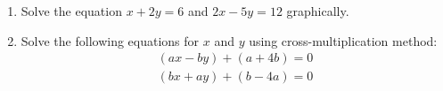 \begin{enumerate}
\item Solve the equation $x+2y=6$ and $2x-5y=12$ graphically.
\item Solve the following equations for $x$ and $y$ using cross-multiplication method:                                                               \begin{align}
                (ax-by)+(a+4b)=0 \\
                (bx+ay)+(b-4a)=0
        \end{align}
\end{enumerate}
